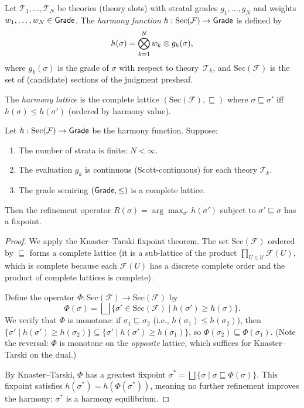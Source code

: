 \begin{definition}
\label{def:harmony}
Let $\mathcal{T}_1, \ldots, \mathcal{T}_N$ be theories (theory slots)
with stratal grades $g_1, \ldots, g_N$ and weights
$w_1, \ldots, w_N \in \mathsf{Grade}$.  The \emph{harmony function}
$h : \mathrm{Sec}(\mathcal{F}) \to \mathsf{Grade}$ is defined by
\[
  h(\sigma) = \bigotimes_{k=1}^{N} w_k \otimes g_k(\sigma),
\]
where $g_k(\sigma)$ is the grade of $\sigma$ with respect to
theory~$\mathcal{T}_k$, and $\mathrm{Sec}(\mathcal{F})$ is the set
of (candidate) sections of the judgment presheaf.
\end{definition}

\begin{definition}
\label{def:harmony-lattice}
The \emph{harmony lattice} is the complete lattice
$(\mathrm{Sec}(\mathcal{F}), \sqsubseteq)$ where
$\sigma \sqsubseteq \sigma'$ iff $h(\sigma) \leq h(\sigma')$
(ordered by harmony value).
\end{definition}

\begin{theorem}
\label{thm:harmony-fix}
Let $h : \mathrm{Sec}(\mathcal{F}) \to \mathsf{Grade}$ be the harmony
function.  Suppose:
\begin{enumerate}[label=(\roman*),nosep]
\item The number of strata is finite: $N < \infty$.
\item The evaluation $g_k$ is continuous (Scott-continuous) for each
  theory $\mathcal{T}_k$.
\item The grade semiring $(\mathsf{Grade}, \leq)$ is a complete lattice.
\end{enumerate}
Then the refinement operator
$R(\sigma) = \arg\max_{\sigma'} h(\sigma')$ subject to
$\sigma' \sqsubseteq \sigma$ has a fixpoint.
\end{theorem}

\begin{proof}
We apply the Knaster--Tarski fixpoint theorem.  The set
$\mathrm{Sec}(\mathcal{F})$ ordered by $\sqsubseteq$ forms a
complete lattice (it is a sub-lattice of the product
$\prod_{U \in \mathcal{U}} \mathcal{F}(U)$, which is complete because
each $\mathcal{F}(U)$ has a discrete complete order and the product
of complete lattices is complete).

Define the operator $\Phi : \mathrm{Sec}(\mathcal{F}) \to
\mathrm{Sec}(\mathcal{F})$ by
\[
  \Phi(\sigma) = \bigsqcup \{\sigma' \in \mathrm{Sec}(\mathcal{F})
  \mid h(\sigma') \geq h(\sigma)\}.
\]
We verify that $\Phi$ is monotone: if $\sigma_1 \sqsubseteq
\sigma_2$ (i.e., $h(\sigma_1) \leq h(\sigma_2)$), then
$\{\sigma' \mid h(\sigma') \geq h(\sigma_2)\} \subseteq
\{\sigma' \mid h(\sigma') \geq h(\sigma_1)\}$, so
$\Phi(\sigma_2) \sqsubseteq \Phi(\sigma_1)$.  (Note the reversal:
$\Phi$ is monotone on the \emph{opposite} lattice, which suffices for
Knaster--Tarski on the dual.)

By Knaster--Tarski, $\Phi$ has a greatest fixpoint
$\sigma^* = \bigsqcup\{\sigma \mid \sigma \sqsubseteq \Phi(\sigma)\}$.
This fixpoint satisfies $h(\sigma^*) = h(\Phi(\sigma^*))$, meaning
no further refinement improves the harmony: $\sigma^*$ is a
harmony equilibrium.
\end{proof}


